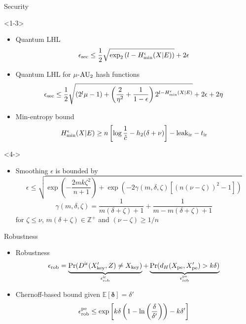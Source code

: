 \documentclass[xcolor=dvipsnames]{beamer}
\newcommand{\?}{\mathrel{?}} %
\newcommand{\rv}[1]{\boldsymbol{\mathbf{#1}}} %
\newcommand{\E}{\mathbb{E}} %
\newcommand{\pe}{\rm pe}
\newcommand{\ir}{\rm ir}
\newcommand{\leakir}{\mathrm{leak}_{\ir}}
\newcommand{\key}{\rm key}
\newcommand{\rob}{\rm rob}
\newcommand{\secur}{\rm sec}
\begin{document}
\begin{frame}{Security}
  \begin{onlyenv}<1-3>
    \begin{itemize}[<+->]
      \item Quantum LHL
        \[ \epsilon_{\secur} \leq \frac{1}{2} \sqrt{ \exp_2\left( l - H^{\epsilon}_{\min}(X|E) \right) } + 2\epsilon \]
      \item Quantum LHL for \(\mu\)-\({\rm AU}_2\) hash functions
        \[ \epsilon_{\secur} \leq \frac{1}{2} \sqrt{ (2^l\mu-1) + \left(\frac{2}{\eta^2} + \frac{1}{1-\epsilon}\right) 2^{ l - H^{\epsilon}_{\min}(X|E) } } + 2\epsilon + 2\eta \]
      \item Min-entropy bound
        \[ H^{\epsilon}_{\min}(X|E) \geq n\left[\log\frac{1}{\hat{c}}-h_2(\delta+\nu)\right] -\leakir -t_{\ir} \]
    \end{itemize}
  \end{onlyenv}
  \begin{onlyenv}<4->
    \begin{itemize}[<+->]
      \item Smoothing \(\epsilon\) is bounded by
        \[ \epsilon \leq \sqrt{ \exp\left( -\frac{2mk\zeta^2}{n+1} \right) + \exp\left( -2\gamma(m,\delta,\zeta) \left[ {(n(\nu-\zeta))}^2 - 1 \right] \right) } \]
        \[ \gamma(m,\delta,\zeta) = \frac{1}{m(\delta+\zeta)+1} + \frac{1}{m-m(\delta+\zeta)+1} \]
        for \(\zeta \leq \nu\), \(m(\delta+\zeta) \in \mathbb{Z}^+\) and \((\nu-\zeta) \geq 1/n\)
    \end{itemize}
  \end{onlyenv}
\end{frame}

\begin{frame}{Robustness}
  \begin{itemize}[<+->]
    \item Robustness
      \[ \epsilon_{\rob} = \underbrace{\Pr(D^{\ir}(X'_{\key}, Z) \neq X_{\key})}_{\epsilon_{\rob}^{\ir}} + \underbrace{\Pr(d_H(X_{\pe}, X'_{\pe}) > k\delta)}_{\epsilon_{\rob}^{\pe}} \]
    \item Chernoff-based bound given \(\E[\rv{\delta}] = \delta'\)
      \[ \epsilon_{\rob}^{\pe} \leq \exp\left[ k\delta\left( 1 - \ln\left( \frac{\delta}{\delta'} \right) \right) - k\delta'  \right] \]
  \end{itemize}
\end{frame}
\end{document}
